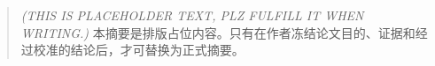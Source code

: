 \begin{abstract}
\textit{(THIS IS PLACEHOLDER TEXT, PLZ FULFILL IT WHEN WRITING.)}
本摘要是排版占位内容。只有在作者冻结论文目的、证据和经过校准的结论后，才可替换为正式摘要。
\end{abstract}
